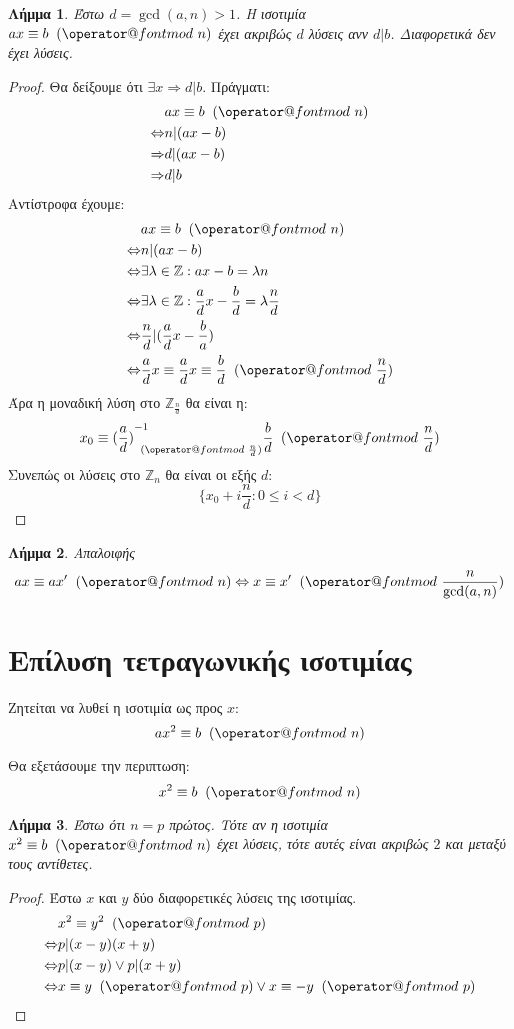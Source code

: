\documentclass[11pt,a4paper]{book}
\makeatletter
\newtheorem*{lemma}{Λήμμα}
\def\imod#1{\allowbreak\mkern10mu({\operator@font mod}\,\,#1)}
\makeatother
\begin{document}
\begin{lemma}
Έστω $d = \gcd( a, n ) > 1$. Η ισοτιμία $ax \equiv b \imod n$ έχει ακριβώς $d$ λύσεις ανν $d|b$. Διαφορετικά δεν έχει λύσεις.
\end{lemma}
\begin{proof}
Θα δείξουμε ότι $\exists x \Rightarrow d|b$. Πράγματι:
\begin{align*}
& ax \equiv b \imod n \\
\Leftrightarrow & n | (ax - b)\\
\Rightarrow & d|(ax-b)\\
\Rightarrow & d|b
\end{align*}
Αντίστροφα έχουμε:
\begin{align*}
& ax \equiv b \imod n\\
\Leftrightarrow & n | (ax - b)\\
\Leftrightarrow & \exists \lambda \in \mathbb{Z}: ax - b = \lambda n\\
\Leftrightarrow & \exists \lambda \in \mathbb{Z}: \frac{a}{d}x - \frac{b}{d} = \lambda\frac{n}{d} \\
\Leftrightarrow & \frac{n}{d} | (\frac{a}{d}x - \frac{b}{a}) \\
\Leftrightarrow & \frac{a}{d}x \equiv \frac{a}{d}x \equiv \frac {b}{d} \imod{\frac{n}{d}}
\end{align*}
Άρα η μοναδική λύση στο $\mathbb{Z}_{\frac{n}{d}}$ θα είναι η:
\[
x_0 \equiv {(\frac{a}{d})}^{-1}_{\imod {\frac{n}{d}}} \frac{b}{d} \imod{\frac{n}{d}}
\]
Συνεπώς οι λύσεις στο $\mathbb{Z}_n$ θα είναι οι εξής $d$:
\[
\{x_0 + i\frac{n}{d}: 0 \leq i < d \}
\]
\end{proof}

\begin{lemma}
Απαλοιφής
\[
ax \equiv ax' \imod n \Leftrightarrow x \equiv x' \imod {\frac{n}{\gcd(a, n)}}
\]
\end{lemma}

\section*{Επίλυση τετραγωνικής ισοτιμίας}

Ζητείται να λυθεί η ισοτιμία ως προς $x$:
\[
ax^2 \equiv b \imod n
\]

Θα εξετάσουμε την περιπτωση:
\[
x^2 \equiv b \imod n
\]

\begin{lemma}
Έστω ότι $n = p$ πρώτος. Τότε αν η ισοτιμία $x^2 \equiv b \imod n$ έχει λύσεις, τότε αυτές είναι ακριβώς $2$ και μεταξύ τους αντίθετες.
\end{lemma}
\begin{proof}
Έστω $x$ και $y$ δύο διαφορετικές λύσεις της ισοτιμίας.
\begin{align*}
&x^2 \equiv y^2 \imod p\\
\Leftrightarrow & p | (x-y)(x+y)\\
\Leftrightarrow & p | (x-y) \lor p | (x+y)\\
\Leftrightarrow & x \equiv y \imod p \lor x \equiv -y \imod p
\end{align*}
\end{proof}
\end{document}
